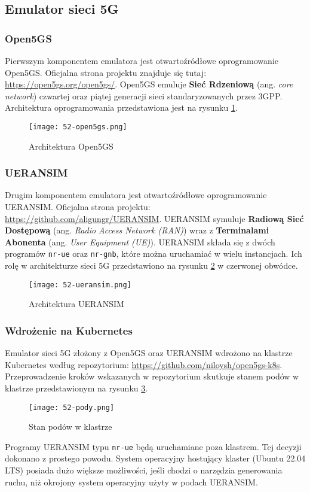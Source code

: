 \subsection{Emulator sieci 5G}

\subsubsection{Open5GS}

Pierwszym komponentem emulatora jest otwartoźródłowe oprogramowanie Open5GS. Oficjalna strona projektu znajduje się tutaj: \url{https://open5gs.org/open5gs/}. Open5GS emuluje \textbf{Sieć Rdzeniową} (ang. \textit{core network}) czwartej oraz piątej generacji sieci standaryzowanych przez 3GPP. Architektura oprogramowania przedstawiona jest na rysunku \ref{fig:52-open5gs}.

\begin{figure}[!h]
    \centering \texttt{[image: 52-open5gs.png]}
    \caption{Architektura Open5GS}\label{fig:52-open5gs}
\end{figure}

\subsubsection{UERANSIM}

Drugim komponentem emulatora jest otwartoźródłowe oprogramowanie UERANSIM. Oficjalna strona projektu: \url{https://github.com/aligungr/UERANSIM}. UERANSIM symuluje \textbf{Radiową Sieć Dostępową} (ang. \textit{Radio Access Network (RAN)}) wraz z \textbf{Terminalami Abonenta} (ang. \textit{User Equipment (UE)}). UERANSIM składa się z dwóch programów \texttt{nr-ue} oraz \texttt{nr-gnb}, które można uruchamiać w wielu instancjach. Ich rolę w architekturze sieci 5G przedstawiono na rysunku \ref{fig:52-ueransim} w czerwonej obwódce.

\begin{figure}[!h]
    \centering \texttt{[image: 52-ueransim.png]}
    \caption{Architektura UERANSIM}\label{fig:52-ueransim}
\end{figure}

\subsubsection{Wdrożenie na Kubernetes}

Emulator sieci 5G złożony z Open5GS oraz UERANSIM wdrożono na klastrze Kubernetes według repozytorium: \url{https://github.com/niloysh/open5gs-k8s}. Przeprowadzenie kroków wskazanych w repozytorium skutkuje stanem podów w klastrze przedstawionym na rysunku \ref{fig:52-pody}.

\begin{figure}[!h]
    \centering \texttt{[image: 52-pody.png]}
    \caption{Stan podów w klastrze}\label{fig:52-pody}
\end{figure}

Programy UERANSIM typu \texttt{nr-ue} będą uruchamiane poza klastrem. Tej decyzji dokonano z prostego powodu. System operacyjny hostujący klaster (Ubuntu 22.04 LTS) posiada dużo większe możliwości, jeśli chodzi o narzędzia generowania ruchu, niż okrojony system operacyjny użyty w podach UERANSIM.